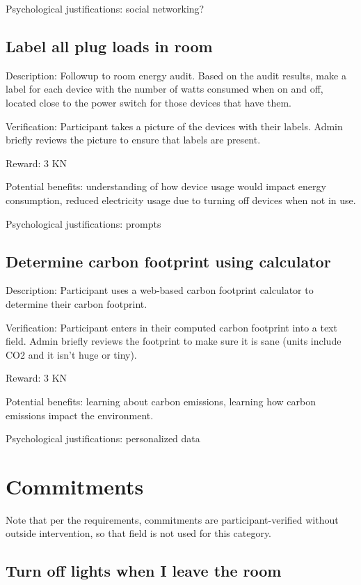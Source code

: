 Psychological justifications: social networking?

\subsection{Label all plug loads in room}

Description: Followup to room energy audit. Based on the audit results, make a label for each device with the number of watts consumed when on and off, located close to the power switch for those devices that have them.

Verification: Participant takes a picture of the devices with their labels. Admin briefly reviews the picture to ensure that labels are present.

Reward: 3 KN

Potential benefits: understanding of how device usage would impact energy consumption, reduced electricity usage due to turning off devices when not in use.

Psychological justifications: prompts

\subsection{Determine carbon footprint using calculator}

Description: Participant uses a web-based carbon footprint calculator to determine their carbon footprint.

Verification: Participant enters in their computed carbon footprint into a text field. Admin briefly reviews the footprint to make sure it is sane (units include CO2 and it isn't huge or tiny).

Reward: 3 KN

Potential benefits: learning about carbon emissions, learning how carbon emissions impact the environment.

Psychological justifications: personalized data


\section{Commitments}

Note that per the requirements, commitments are participant-verified without outside intervention, so that field is not used for this category.

\subsection{Turn off lights when I leave the room}

